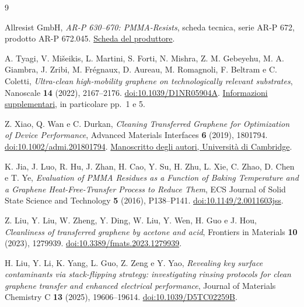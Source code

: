 \documentclass[11pt,reqno]{amsart}
\numberwithin{equation}{section}
\begin{document}
\begin{thebibliography}{9}

Allresist GmbH,
\emph{AR-P 630--670: PMMA-Resists}, scheda tecnica, serie AR-P 672,
prodotto AR-P 672.045.
\href{https://www.allresist.de/wp-content/uploads/2020/03/AR-P630-670_Deutsch_Allresist_Produktinformation.pdf}{Scheda del produttore}.

A. Tyagi, V. Mi\v{s}eikis, L. Martini, S. Forti, N. Mishra,
Z. M. Gebeyehu, M. A. Giambra, J. Zribi, M. Fr\'egnaux,
D. Aureau, M. Romagnoli, F. Beltram e C. Coletti,
\emph{Ultra-clean high-mobility graphene on technologically relevant substrates},
Nanoscale \textbf{14} (2022), 2167--2176.
\href{https://doi.org/10.1039/D1NR05904A}{doi:10.1039/D1NR05904A}.
\href{https://www.rsc.org/suppdata/d1/nr/d1nr05904a/d1nr05904a1.pdf}{Informazioni supplementari},
in particolare pp.~1 e 5.

Z. Xiao, Q. Wan e C. Durkan,
\emph{Cleaning Transferred Graphene for Optimization of Device Performance},
Advanced Materials Interfaces \textbf{6} (2019), 1801794.
\href{https://doi.org/10.1002/admi.201801794}{doi:10.1002/admi.201801794}.
\href{https://www.repository.cam.ac.uk/handle/1810/291256}{Manoscritto degli autori, Universit\`a di Cambridge}.

K. Jia, J. Luo, R. Hu, J. Zhan, H. Cao, Y. Su, H. Zhu, L. Xie,
C. Zhao, D. Chen e T. Ye,
\emph{Evaluation of PMMA Residues as a Function of Baking Temperature and
a Graphene Heat-Free-Transfer Process to Reduce Them},
ECS Journal of Solid State Science and Technology \textbf{5} (2016), P138--P141.
\href{https://doi.org/10.1149/2.0011603jss}{doi:10.1149/2.0011603jss}.

Z. Liu, Y. Liu, W. Zheng, Y. Ding, W. Liu, Y. Wen, H. Guo e J. Hou,
\emph{Cleanliness of transferred graphene by acetone and acid},
Frontiers in Materials \textbf{10} (2023), 1279939.
\href{https://doi.org/10.3389/fmats.2023.1279939}{doi:10.3389/fmats.2023.1279939}.

H. Liu, Y. Li, K. Yang, L. Guo, Z. Zeng e Y. Yao,
\emph{Revealing key surface contaminants via stack-flipping strategy:
investigating rinsing protocols for clean graphene transfer and
enhanced electrical performance},
Journal of Materials Chemistry C \textbf{13} (2025), 19606--19614.
\href{https://doi.org/10.1039/D5TC02259B}{doi:10.1039/D5TC02259B}.

\end{thebibliography}
\end{document}
